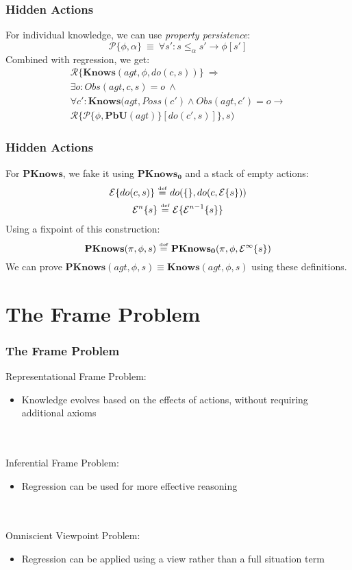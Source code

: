 \documentclass{beamer}
\newcommand{\isdef}{\hbox{$\stackrel{\mbox{\tiny def}}{=}$}}
\begin{document}
\begin{frame}
\frametitle{Hidden Actions}
For individual knowledge, we can use \emph{property persistence}:
\begin{equation*}
\mathcal{P}\{\phi,\alpha\}\ \equiv\ \forall s': s \leq_{\alpha} s' \rightarrow \phi[s']
\end{equation*}
Combined with regression, we get:
\begin{multline*}
\mathcal{R}\{\mathbf{Knows}(agt,\phi,do(c,s))\}\ \Rightarrow \\
\exists o: Obs(agt,c,s)=o\ \wedge\\
\forall c': \mathbf{Knows}(agt,Poss(c') \wedge Obs(agt,c')=o \rightarrow \\
 \mathcal{R}\{\mathcal{P}\{\phi,\mathbf{PbU}(agt)\}[do(c',s)]\},s)
\end{multline*}
\end{frame}

\begin{frame}
\frametitle{Hidden Actions}
For $\mathbf{PKnows}$, we fake it using $\mathbf{PKnows_0}$ and a stack of empty actions:
\begin{gather*}
\mathcal{E}\{do(c,s)\}\ \isdef\ do(\{\},do(c,\mathcal{E}\{s\})) \\
\mathcal{E}^n\{s\}\ \isdef\ \mathcal{E}\{\mathcal{E}^{n-1}\{s\}\}
\end{gather*}
Using a fixpoint of this construction:
\begin{equation*}
\mathbf{PKnows}(\pi,\phi,s)\ \isdef\ \mathbf{PKnows_0}(\pi,\phi,\mathcal{E}^{\infty}\{s\})
\end{equation*}
We can prove $\mathbf{PKnows}(agt,\phi,s) \equiv \mathbf{Knows}(agt,\phi,s)$ using these definitions.
\end{frame}

\section{The Frame Problem}

\begin{frame}
\frametitle{The Frame Problem}
Representational Frame Problem:
\begin{itemize}
\item Knowledge evolves based on the effects of actions, without requiring additional axioms
\end{itemize}
\ \\
\ \\
Inferential Frame Problem:
\begin{itemize}
\item Regression can be used for more effective reasoning
\end{itemize}
\ \\
\ \\
Omniscient Viewpoint Problem:
\begin{itemize}
\item Regression can be applied using a view rather than a full situation term
\end{itemize}
\end{frame}
\end{document}
